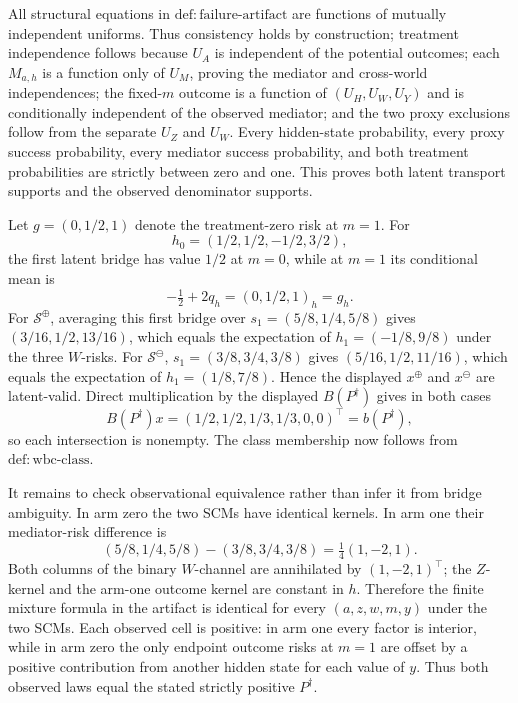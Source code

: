 All structural equations in \(\mathrm{def{:}failure\text{-}artifact}\) are
functions of mutually independent uniforms.  Thus consistency holds by
construction; treatment independence follows because \(U_A\) is independent of
the potential outcomes; each \(M_{a,h}\) is a function only of \(U_M\), proving
the mediator and cross-world independences; the fixed-\(m\) outcome is a function
of \((U_H,U_W,U_Y)\) and is conditionally independent of the observed mediator;
and the two proxy exclusions follow from the separate \(U_Z\) and \(U_W\).
Every hidden-state probability, every proxy success probability, every mediator
success probability, and both treatment probabilities are strictly between zero
and one.  This proves both latent transport supports and the observed denominator
supports.

Let \(g=(0,1/2,1)\) denote the treatment-zero risk at \(m=1\).  For
\[
 h_0=(1/2,1/2,-1/2,3/2),
\]
the first latent bridge has value \(1/2\) at \(m=0\), while at \(m=1\) its
conditional mean is
\[
 -\tfrac12+2q_h=(0,1/2,1)_h=g_h.
\]
For \(\mathcal S^{\oplus}\), averaging this first bridge over
\(s_1=(5/8,1/4,5/8)\) gives
\((3/16,1/2,13/16)\), which equals the expectation of
\(h_1=(-1/8,9/8)\) under the three \(W\)-risks.  For
\(\mathcal S^{\ominus}\), \(s_1=(3/8,3/4,3/8)\) gives
\((5/16,1/2,11/16)\), which equals the expectation of
\(h_1=(1/8,7/8)\).  Hence the displayed \(x^{\oplus}\) and
\(x^{\ominus}\) are latent-valid.  Direct multiplication by the displayed
\(B(P^\dagger)\) gives in both cases
\[
 B(P^\dagger)x=(1/2,1/2,1/3,1/3,0,0)^\top=b(P^\dagger),
\]
so each intersection is nonempty.  The class membership now follows from
\(\mathrm{def{:}wbc\text{-}class}\).

It remains to check observational equivalence rather than infer it from bridge
ambiguity.  In arm zero the two SCMs have identical kernels.  In arm one their
mediator-risk difference is
\[
 (5/8,1/4,5/8)-(3/8,3/4,3/8)=\tfrac14(1,-2,1).
\]
Both columns of the binary \(W\)-channel are annihilated by
\((1,-2,1)^\top\); the \(Z\)-kernel and the arm-one outcome kernel are constant
in \(h\).  Therefore the finite mixture formula in the artifact is identical for
every \((a,z,w,m,y)\) under the two SCMs.  Each observed cell is positive: in arm
one every factor is interior, while in arm zero the only endpoint outcome risks at
\(m=1\) are offset by a positive contribution from another hidden state for each
value of \(y\).  Thus both observed laws equal the stated strictly positive
\(P^\dagger\).


